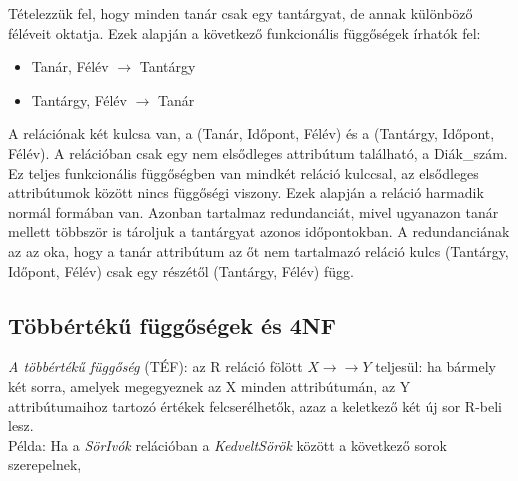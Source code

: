 \documentclass[tikz,12pt,margin=0px]{article}
\begin{document}
{    \noindent Tételezzük fel, hogy minden tanár csak egy tantárgyat, de annak különböző féléveit oktatja. Ezek alapján a következő funkcionális függőségek írhatók fel:
    \begin{itemize}
        \item Tanár, Félév $\to$ Tantárgy
        \item Tantárgy, Félév $\to$ Tanár
    \end{itemize}

    \noindent A relációnak két kulcsa van, a (Tanár, Időpont, Félév) és a (Tantárgy, Időpont, Félév). A relációban csak egy nem elsődleges attribútum található, a Diák\_szám. Ez teljes funkcionális függőségben van mindkét reláció kulccsal, az elsődleges attribútumok között nincs függőségi viszony. Ezek alapján a reláció harmadik normál formában van. Azonban tartalmaz redundanciát, mivel ugyanazon tanár mellett többször is tároljuk a tantárgyat azonos időpontokban. A redundanciának az az oka, hogy a tanár attribútum az őt nem tartalmazó reláció kulcs (Tantárgy, Időpont, Félév) csak egy részétől (Tantárgy, Félév) függ.

    \subsection*{Többértékű függőségek és 4NF}

    \noindent \textit{A többértékű függőség} (TÉF): az R reláció fölött $X \to\to Y$ teljesül: ha bármely két sorra, amelyek megegyeznek az X minden attribútumán, az Y attribútumaihoz tartozó értékek felcserélhetők, azaz a keletkező két új sor R-beli lesz.\\

    \noindent Példa: Ha a \emph{SörIvók} relációban a \emph{KedveltSörök} között a következő sorok szerepelnek,

}
\end{document}
